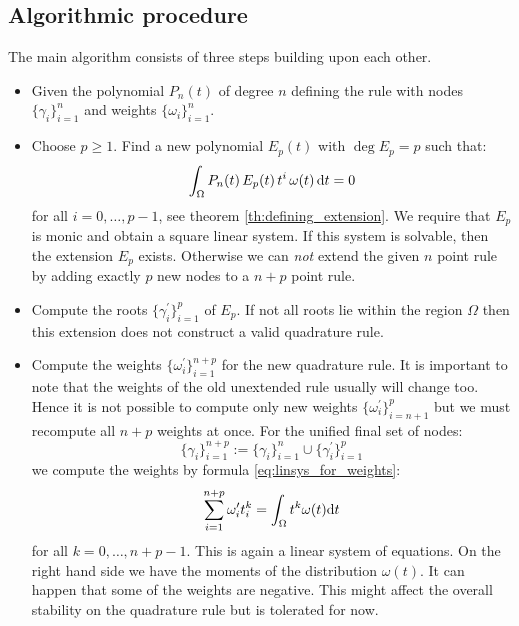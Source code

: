 \documentclass[a4paper,10pt]{article}
\begin{document}
\FloatBarrier
\subsection{Algorithmic procedure}

The main algorithm consists of three steps building upon each other.

\begin{itemize}
  \item Given the polynomial $P_n(t)$ of degree $n$ defining the rule
    with nodes $\{\gamma_i\}_{i=1}^{n}$ and weights $\{\omega_i\}_{i=1}^{n}$.
  \item Choose $p \geq 1$.
    Find a new polynomial $E_p(t)$ with $\deg E_p = p$ such that:
    \begin{equation}
      \int_{\Omega} P_n(t) \, E_p(t) \, t^i \, \omega(t) \, \mathrm{d}t = 0
    \end{equation}
    for all $i = 0, \ldots, p-1$, see theorem \ref{th:defining_extension}.
    We require that $E_p$ is monic and obtain a square linear system.
    If this system is solvable, then the extension $E_p$ exists.
    Otherwise we can \emph{not} extend the given $n$ point rule by
    adding exactly $p$ new nodes to a $n+p$ point rule.
  \item Compute the roots $\{\gamma^\prime_i\}_{i=1}^{p}$ of $E_p$.
    If not all roots lie within the region $\Omega$ then this extension
    does not construct a valid quadrature rule.
  \item Compute the weights $\{\omega^\prime_i\}_{i=1}^{n+p}$ for the new
    quadrature rule. It is important to note that the weights of the old
    unextended rule usually will change too. Hence it is not possible to
    compute only new weights $\{\omega^\prime_i\}_{i=n+1}^{p}$ but we must
    recompute all $n+p$ weights at once. For the unified final set of nodes:
    \begin{equation}
      \{\gamma_i\}_{i=1}^{n+p} := \{\gamma_i\}_{i=1}^{n} \cup \{\gamma^\prime_i\}_{i=1}^{p}
    \end{equation}
    we compute the weights by formula \eqref{eq:linsys_for_weights}:
    \begin{equation}
      \sum_{i=1}^{n+p} \omega^\prime_i t_i^k = \int_{\Omega} t^k \omega(t) \mathrm{d}t
    \end{equation}
    for all $k=0, \ldots, n+p-1$. This is again a linear system
    of equations. On the right hand side we have the moments of the
    distribution $\omega(t)$. It can happen that some of the weights
    are negative. This might affect the overall stability on the quadrature
    rule but is tolerated for now.
\end{itemize}
\end{document}
